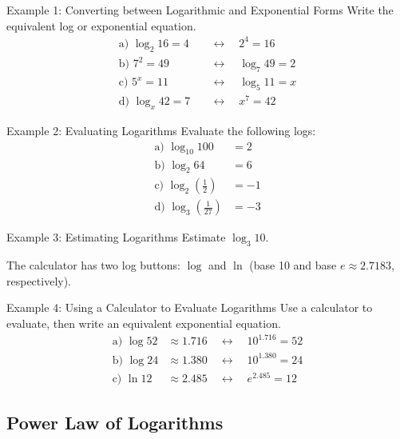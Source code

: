 \documentclass{article}
\begin{document}
\begin{examplebox}{Example 1: Converting between Logarithmic and Exponential Forms}
Write the equivalent log or exponential equation.
\begin{align*}
    \text{a) } \log_2{16} = 4 &\quad \leftrightarrow \quad 2^4 = 16\\
    \text{b) } 7^2 = 49 &\quad \leftrightarrow \quad \log_7{49} = 2\\
    \text{c) } 5^x = 11 &\quad \leftrightarrow \quad \log_5{11} = x\\
    \text{d) } \log_x{42} = 7 &\quad \leftrightarrow \quad x^7 = 42
\end{align*}
\end{examplebox}

\begin{examplebox}{Example 2: Evaluating Logarithms}
Evaluate the following logs:
\begin{align*}
    \text{a) } \log_{10}{100} &= 2\\
    \text{b) } \log_2{64} &= 6\\
    \text{c) } \log_2{\left(\frac{1}{2}\right)} &= -1\\
    \text{d) } \log_3{\left(\frac{1}{27}\right)} &= -3
\end{align*}
\end{examplebox}

\begin{examplebox}{Example 3: Estimating Logarithms}
Estimate \(\log_3{10}\).

The calculator has two log buttons: \(\log\) and \(\ln\) (base 10 and base \(e \approx 2.7183\), respectively).
\end{examplebox}

\begin{examplebox}{Example 4: Using a Calculator to Evaluate Logarithms}
Use a calculator to evaluate, then write an equivalent exponential equation.
\begin{align*}
    \text{a) } \log{52} &\approx 1.716 \quad \leftrightarrow \quad 10^{1.716} = 52\\
    \text{b) } \log{24} &\approx 1.380 \quad \leftrightarrow \quad 10^{1.380} = 24\\
    \text{c) } \ln{12} &\approx 2.485 \quad \leftrightarrow \quad e^{2.485} = 12
\end{align*}
\end{examplebox}

\subsection{Power Law of Logarithms}
\end{document}
